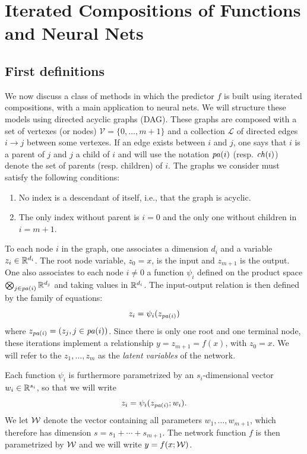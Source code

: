 \chapter[Neural Nets]{Iterated Compositions of  Functions and Neural Nets}
\label{chap:neural.nets}

\section{First definitions}
We now discuss a class of methods in which the predictor $f$ is built using iterated compositions, with a main application to neural nets.  We will structure these models using  directed acyclic graphs (DAG). These graphs are  composed with a set of vertexes (or nodes) $\mathcal V = \{0, \ldots, m+1\}$ and a collection $\mathcal L$  of directed edges $i\to j$ between some vertexes.  If  an edge exists between $i$ and $j$, one says that $i$ is a parent of $j$ and $j$ a child of $i$ and  will use the notation ${\mathit{pa}(i)}$ (resp. ${\mathit{ch}(i)}$) denote the set of parents (resp. children) of $i$. The graphs we consider must satisfy the following conditions:
\begin{enumerate}[label = (\roman*),wide=0.5cm]
\item No index is a descendant of itself, i.e., that the graph is acyclic.
\item The only index without parent is $i=0$ and the only one without children in $i=m+1$.
\end{enumerate}

To each node $i$ in the graph, one associates a dimension $d_i$ and a variable $z_i \in {\mathbb{R}}^{d_i}$. 
The root node variable,   $z_0 = x$, is the input  and $z_{m+1}$ is the output.
One also associates to each node $i\neq 0$ a function $\psi_i$ defined on the product space $\bigotimes_{j\in{\mathit{pa}(i)}} {\mathbb{R}}^{d_j}$ and taking values in ${\mathbb{R}}^{d_i}$.
The input-output relation is then defined by the family of equations:
\[
z_i = \psi_i(z_{{\mathit{pa}(i)}})
\]
where  $z_{{\mathit{pa}(i)}} = (z_j, j\in{\mathit{pa}(i)})$.
Since there is only one root  and one terminal node, these iterations implement a relationship $y = z_{m+1} = f(x)$, with $z_0=x$. We will refer to the $z_1, \ldots, z_m$ as the {\em latent variables} of the network.

Each function $\psi_i$ is furthermore parametrized by an $s_i$-dimensional vector  $w_i \in {\mathbb{R}}^{s_i}$, so that we will write 
\[
z_i = \psi_i(z_{{\mathit{pa}(i)}}; w_i).
\]
 We let ${\mathcal W}$ denote the vector containing all parameters $w_1, \ldots, w_{m+1}$, which therefore has dimension $s = s_1+\cdots + s_{m+1}$.
 The network function $f$ is then parametrized by ${\mathcal W}$ and we will write $y = f(x;{\mathcal W})$.
 
